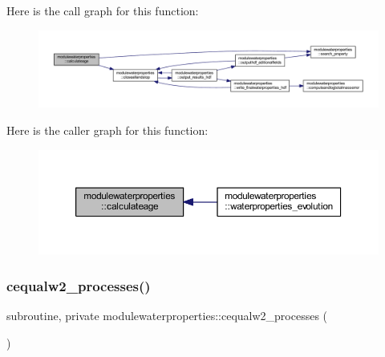 Here is the call graph for this function\+:\nopagebreak
\begin{figure}[H]
\begin{center}
\leavevmode
\includegraphics[width=350pt]{namespacemodulewaterproperties_a93266e9cb4d7560fc55136ac596e1c35_cgraph}
\end{center}
\end{figure}
Here is the caller graph for this function\+:\nopagebreak
\begin{figure}[H]
\begin{center}
\leavevmode
\includegraphics[width=350pt]{namespacemodulewaterproperties_a93266e9cb4d7560fc55136ac596e1c35_icgraph}
\end{center}
\end{figure}
\mbox{\label{namespacemodulewaterproperties_a77c662c86e2d882859f2a18d2cde59d1}} 
\subsubsection{\texorpdfstring{cequalw2\+\_\+processes()}{cequalw2\_processes()}}
{\footnotesize\ttfamily subroutine, private modulewaterproperties\+::cequalw2\+\_\+processes (\begin{DoxyParamCaption}{ }\end{DoxyParamCaption})\hspace{0.3cm}{\ttfamily [private]}}

